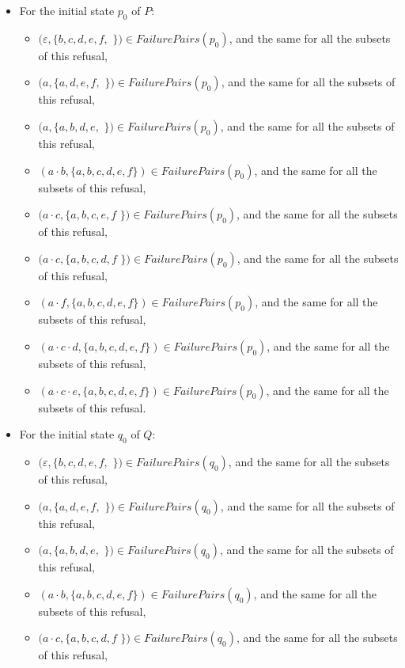 \documentclass[11pt]{article}
\newcommand{\cmark}{\ding{51}}
\theoremstyle{definition}
\theoremstyle{plain}
\begin{document}
\begin{itemize}
	\item For the initial state $ p_0 $ of $ P $:
	\begin{itemize}
		\item $(\varepsilon, \{b, c, d, e, f, $ \cmark $\}) \in FailurePairs(p_0)$, and the same for all the subsets of this refusal,
		\item $(a, \{a, d, e, f, $ \cmark $\}) \in FailurePairs(p_0)$, and the same for all the subsets of this refusal,
		\item $(a, \{a, b, d, e, $ \cmark $\}) \in FailurePairs(p_0)$, and the same for all the subsets of this refusal,
		\item $(a\cdot b, \{a, b, c, d, e, f\}) \in FailurePairs(p_0)$, and the same for all the subsets of this refusal,
		\item $(a\cdot c, \{a, b, c, e, f$ \cmark $\}) \in FailurePairs(p_0)$, and the same for all the subsets of this refusal,
		\item $(a\cdot c, \{a, b, c, d, f$ \cmark $\}) \in FailurePairs(p_0)$, and the same for all the subsets of this refusal,
		\item $(a\cdot f, \{a, b, c, d, e, f\}) \in FailurePairs(p_0)$, and the same for all the subsets of this refusal,
		\item $(a\cdot c\cdot d, \{a, b, c, d, e, f\}) \in FailurePairs(p_0)$, and the same for all the subsets of this refusal,
		\item $(a\cdot c\cdot e, \{a, b, c, d, e, f\}) \in FailurePairs(p_0)$, and the same for all the subsets of this refusal.
	\end{itemize}
	\item For the initial state $ q_0 $ of $ Q $:
	\begin{itemize}
		\item $(\varepsilon, \{b, c, d, e, f, $ \cmark $\}) \in FailurePairs(q_0)$, and the same for all the subsets of this refusal,
		\item $(a, \{a, d, e, f, $ \cmark $\}) \in FailurePairs(q_0)$, and the same for all the subsets of this refusal,
		\item $(a, \{a, b, d, e, $ \cmark $\}) \in FailurePairs(q_0)$, and the same for all the subsets of this refusal,
		\item $(a\cdot b, \{a, b, c, d, e, f\}) \in FailurePairs(q_0)$, and the same for all the subsets of this refusal,
		\item $(a\cdot c, \{a, b, c, d, f$ \cmark $\}) \in FailurePairs(q_0)$, and the same for all the subsets of this refusal,

\end{itemize}
\end{itemize}
\end{document}
